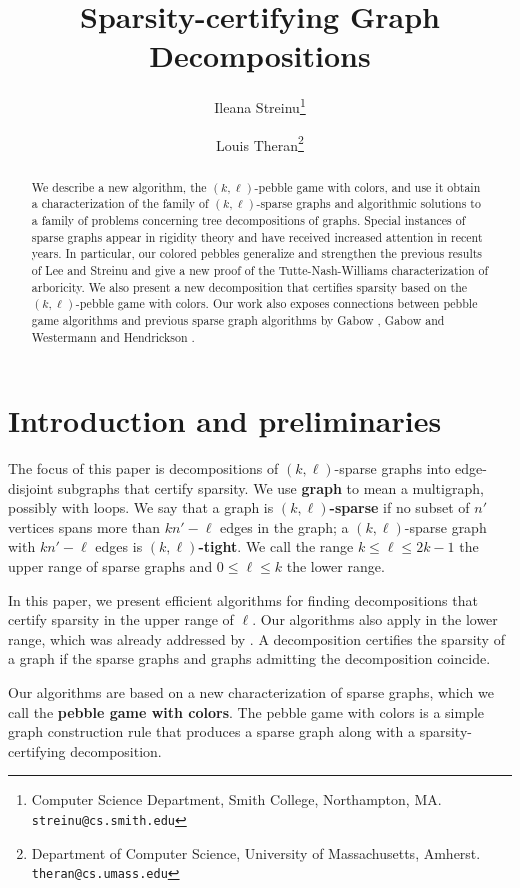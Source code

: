 \documentclass[11pt]{article}
\author{Ileana Streinu\thanks{Computer Science Department, Smith College, Northampton, MA. {\tt streinu@cs.smith.edu}} \and Louis Theran\thanks{Department of Computer Science, University of Massachusetts, Amherst. {\tt theran@cs.umass.edu}}}
\title{Sparsity-certifying Graph Decompositions}
\date{}
\begin{document}
	\maketitle
		\begin{abstract}
			We describe a new algorithm, the $(k,\ell)$-pebble game with colors, 
			and use it obtain a characterization of the family of $(k,\ell)$-sparse graphs 
			and algorithmic solutions to a family of problems concerning tree decompositions of graphs. 
			Special instances of sparse graphs appear in rigidity theory and have received 
			increased attention in recent years. In particular, our colored pebbles generalize 
			and strengthen the previous results of Lee and Streinu \cite{LeSt05} and give a 
			new proof of the Tutte-Nash-Williams characterization of arboricity.  
			We also present a new decomposition that certifies sparsity based on the $(k,\ell)$-pebble 
			game with colors.  Our work also exposes connections between pebble game algorithms and 
			previous sparse graph algorithms by Gabow \cite{gabow1995}, Gabow and 
			Westermann \cite{GaWe88} and Hendrickson
			 \cite{hendrickson-thesis,hendrickson:uniqueRealizability:1992}.
		\end{abstract}

		\section{Introduction and preliminaries}

		The focus of this paper
		is decompositions of $(k,\ell)$-sparse graphs into edge-disjoint 
		subgraphs that certify sparsity.  We use {\bf graph} to mean a multigraph, 
		possibly with loops.
		We say that a graph is {\bf $(k,\ell)$-sparse} if no subset of $n'$ vertices 
		spans more than $kn'-\ell$ edges in the graph; a $(k,\ell)$-sparse graph 
		with $kn'-\ell$ edges is {\bf $(k,\ell)$-tight}.
		We call 
		the range $k\le \ell\le 2k-1$ the upper range of sparse graphs
		and $0\le \ell\le k$ the lower range.

		In this paper, we  
		present  efficient algorithms for finding decompositions 
		that certify sparsity in the upper range of $\ell$.  Our algorithms
		also apply in the lower range, which was already addressed by 
		\cite{gabow1995,GaWe88,Ed65,RoTa85,DBLP:conf/aussois/Edmonds01}.
        A decomposition certifies 
		the sparsity of a graph if the sparse graphs and graphs admitting 
		the decomposition coincide.
 
		Our algorithms are based on a new characterization of sparse graphs, 
		which we call the {\bf pebble game with colors}.  
		The pebble game with colors is a 
		simple graph construction rule that produces a sparse graph along with a 
		sparsity-certifying decomposition.
\end{document}
